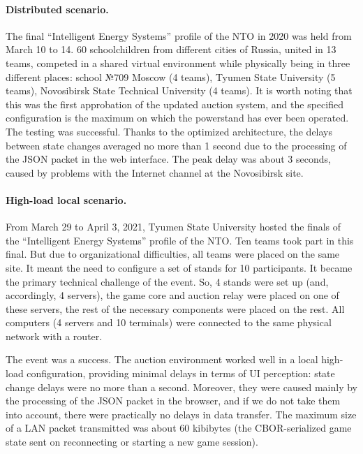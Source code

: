 \documentclass[
]{ceurart}
\begin{document}
\paragraph{Distributed scenario.}
\label{sec:eval-distr}
The final “Intelligent Energy Systems” profile of the NTO in 2020 was held from March 10 to 14. 60 schoolchildren from different cities of Russia, united in 13 teams, competed in a shared virtual environment while physically being in three different places:
school №709 Moscow (4 teams),
Tyumen State University (5 teams),
Novosibirsk State Technical University (4 teams).
It is worth noting that this was the first approbation of the updated auction system, and the specified configuration is the maximum on which the powerstand has ever been operated. The testing was successful. Thanks to the optimized architecture, the delays between state changes averaged no more than 1 second due to the processing of the JSON packet in the web interface. The peak delay was about 3 seconds, caused by problems with the Internet channel at the Novosibirsk site.

\paragraph{High-load local scenario.}
\label{sec:eval-high}
From March 29 to April 3, 2021, Tyumen State University hosted the finals of the ``Intelligent Energy Systems'' profile of the NTO. Ten teams took part in this final. But due to organizational difficulties, all teams were placed on the same site. It meant the need to configure a set of stands for 10 participants. It became the primary technical challenge of the event. So, 4 stands were set up (and, accordingly, 4 servers), the game core and auction relay were placed on one of these servers, the rest of the necessary components were placed on the rest. All computers (4 servers and 10 terminals) were connected to the same physical network with a router.

The event was a success. The auction environment worked well in a local high-load configuration, providing minimal delays in terms of UI perception: state change delays were no more than a second. Moreover, they were caused mainly by the processing of the JSON packet in the browser, and if we do not take them into account, there were practically no delays in data transfer. The maximum size of a LAN packet transmitted was about 60 kibibytes (the CBOR-serialized game state sent on reconnecting or starting a new game session).
\end{document}
